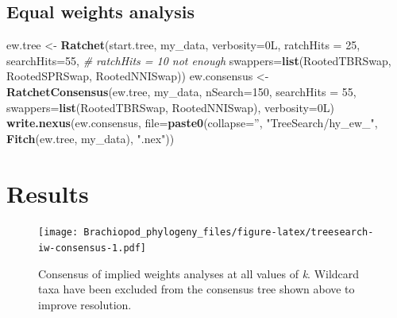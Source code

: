 \documentclass[openany]{book}
\newenvironment{Shaded}{\begin{snugshade}}{\end{snugshade}}
\newcommand{\KeywordTok}[1]{\textcolor[rgb]{0.13,0.29,0.53}{\textbf{#1}}}
\newcommand{\DataTypeTok}[1]{\textcolor[rgb]{0.13,0.29,0.53}{#1}}
\newcommand{\DecValTok}[1]{\textcolor[rgb]{0.00,0.00,0.81}{#1}}
\newcommand{\StringTok}[1]{\textcolor[rgb]{0.31,0.60,0.02}{#1}}
\newcommand{\CommentTok}[1]{\textcolor[rgb]{0.56,0.35,0.01}{\textit{#1}}}
\newcommand{\NormalTok}[1]{#1}
\theoremstyle{definition}
\theoremstyle{definition}
\theoremstyle{definition}
\theoremstyle{remark}
\begin{document}
\subsection{Equal weights analysis}\label{equal-weights-analysis}

\begin{Shaded}
\begin{Highlighting}[]
\NormalTok{ew.tree <-}\StringTok{ }\KeywordTok{Ratchet}\NormalTok{(start.tree, my_data, }\DataTypeTok{verbosity=}\NormalTok{0L,}
                   \DataTypeTok{ratchHits =} \DecValTok{25}\NormalTok{, }\DataTypeTok{searchHits=}\DecValTok{55}\NormalTok{, }\CommentTok{# ratchHits = 10 not enough}
                   \DataTypeTok{swappers=}\KeywordTok{list}\NormalTok{(RootedTBRSwap, RootedSPRSwap, RootedNNISwap))}
\NormalTok{ew.consensus <-}\StringTok{ }\KeywordTok{RatchetConsensus}\NormalTok{(ew.tree, my_data, }\DataTypeTok{nSearch=}\DecValTok{150}\NormalTok{, }\DataTypeTok{searchHits =} \DecValTok{55}\NormalTok{,}
                                 \DataTypeTok{swappers=}\KeywordTok{list}\NormalTok{(RootedTBRSwap, RootedNNISwap),}
                                 \DataTypeTok{verbosity=}\NormalTok{0L)}
\KeywordTok{write.nexus}\NormalTok{(ew.consensus, }\DataTypeTok{file=}\KeywordTok{paste0}\NormalTok{(}\DataTypeTok{collapse=}\StringTok{''}\NormalTok{, }\StringTok{"TreeSearch/hy_ew_"}\NormalTok{,}
                                      \KeywordTok{Fitch}\NormalTok{(ew.tree, my_data), }\StringTok{".nex"}\NormalTok{))}
\end{Highlighting}
\end{Shaded}

\section{Results}\label{results}





\begin{figure}
\centering
\texttt{[image: Brachiopod\_phylogeny\_files/figure-latex/treesearch-iw-consensus-1.pdf]}
\caption{\label{fig:treesearch-iw-consensus}Consensus of implied weights analyses at all values of
\emph{k}. Wildcard taxa have been excluded from the consensus tree shown
above to improve resolution.}
\end{figure}








\clearpage 
\end{document}
